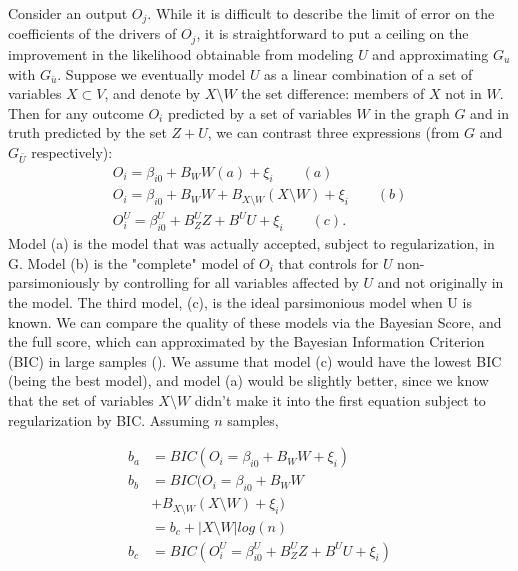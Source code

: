 \documentclass{article}
\begin{document}
Consider an output $O_j$.  While it is difficult to describe the limit of error on the coefficients of the drivers of $O_j$, it is straightforward to put a ceiling on the improvement in the likelihood obtainable from modeling $U$ and approximating $G_u$ with $G_{\bar{u}}$.  Suppose we eventually model $U$ as a linear combination of a set of variables $X \subset V$, and denote by $X \setminus W$ the set difference: members of $X$ not in $W$.  Then for any outcome $O_i$ predicted by a set of variables $W$ in the graph $G$ and in truth predicted by the set $Z + U$, we can contrast three expressions (from $G$ and $G_{\bar{U}}$ respectively):
\begin{equation}
\begin{split}
O_i = \beta_{i0} + B_W W (a) + \xi_i \qquad (a)\\
O_i = \beta_{i0} + B_W W + B_{X \setminus W} (X \setminus W)
 + \xi_i \qquad (b)\\
O_i^U = \beta_{i0}^U + B_Z^U Z + B^U U + \xi_i \qquad (c).
\end{split}
\end{equation}
Model (a) is the model that was actually accepted, subject to regularization, in G.  Model (b) is the "complete" model of $O_i$ that controls for $U$ non-parsimoniously by controlling for all variables affected by $U$ and not originally in the model.  The third model, (c), is the ideal parsimonious model when U is known.  We can compare the quality of these models via the Bayesian Score, and the full score, which can approximated by the Bayesian Information Criterion (BIC) in large samples (\cite{koller_probabilistic_2009}).  We assume that model (c) would have the lowest BIC (being the best model), and model (a) would be slightly better, since we know that the set of variables $X \setminus W$ didn't make it into the first equation subject to regularization by BIC.  Assuming $n$ samples,

\begin{align}
b_{a} &= BIC(O_{i} = \beta_{i0} + B_W W + \xi_i)  \\
b_{b} &= BIC(O_i = \beta_{i0} + B_W W  \\
               &  + B_{X \setminus W} (X \setminus W) + \xi_i) \nonumber \\
&  = b_c + |X\setminus W| log(n) \nonumber \\
b_{c} &= BIC(O_i^U = \beta_{i0}^U + B_Z^U Z + B^U U + \xi_i)
\end{align}
\end{document}
